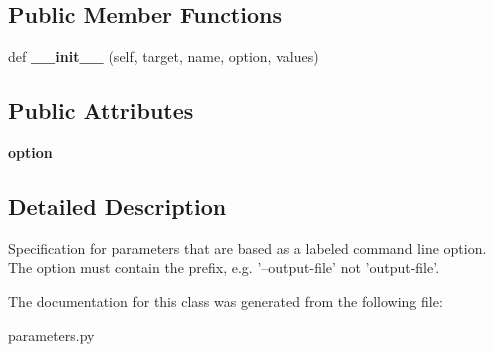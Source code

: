 \subsection*{Public Member Functions}
\begin{DoxyCompactItemize}
\item 
\mbox{\label{classcodar_1_1cheetah_1_1parameters_1_1_param_cmd_line_option_a7bf4c15694189c9570d3eb3d3b30b7f2}} 
def {\bfseries \+\_\+\+\_\+init\+\_\+\+\_\+} (self, target, name, option, values)
\end{DoxyCompactItemize}
\subsection*{Public Attributes}
\begin{DoxyCompactItemize}
\item 
\mbox{\label{classcodar_1_1cheetah_1_1parameters_1_1_param_cmd_line_option_a75dae9b35fe11bc6833cfa0777185e20}} 
{\bfseries option}
\end{DoxyCompactItemize}


\subsection{Detailed Description}
\begin{DoxyVerb}Specification for parameters that are based as a labeled command line
option. The option must contain the prefix, e.g. '--output-file' not
'output-file'.\end{DoxyVerb}
 

The documentation for this class was generated from the following file\+:\begin{DoxyCompactItemize}
\item 
parameters.\+py\end{DoxyCompactItemize}
